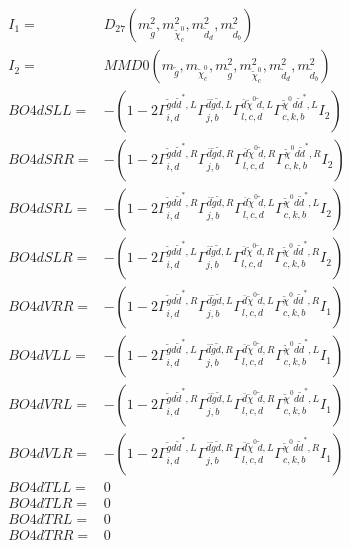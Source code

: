 \documentclass[A4,landscape]{article}
\begin{document}
\begin{align} 
I_1 = & D_{27}(m^2_{\tilde{g}}, m^2_{\tilde{\chi}^0_{{c}}}, m^2_{\tilde{d}_{{d}}}, m^2_{\tilde{d}_{{b}}}) \\ 
I_2 = & MMD0(m_{\tilde{g}}, m_{\tilde{\chi}^0_{{c}}}, m^2_{\tilde{g}}, m^2_{\tilde{\chi}^0_{{c}}}, m^2_{\tilde{d}_{{d}}}, m^2_{\tilde{d}_{{b}}}) \\ 
  BO4dSLL= & -(1
-
2 \Gamma^{\tilde{g} d \tilde{d}^*,L}_{i, d} \Gamma^{\bar{d}\tilde{g} \tilde{d} ,L}_{j, b} \Gamma^{\bar{d}\tilde{\chi}^0 \tilde{d} ,L}_{l, c, d} \Gamma^{\tilde{\chi}^0 d \tilde{d}^*,L}_{c, k, b} I_2) \\ 
  BO4dSRR= & -(1
-
2 \Gamma^{\tilde{g} d \tilde{d}^*,R}_{i, d} \Gamma^{\bar{d}\tilde{g} \tilde{d} ,R}_{j, b} \Gamma^{\bar{d}\tilde{\chi}^0 \tilde{d} ,R}_{l, c, d} \Gamma^{\tilde{\chi}^0 d \tilde{d}^*,R}_{c, k, b} I_2) \\ 
  BO4dSRL= & -(1
-
2 \Gamma^{\tilde{g} d \tilde{d}^*,R}_{i, d} \Gamma^{\bar{d}\tilde{g} \tilde{d} ,R}_{j, b} \Gamma^{\bar{d}\tilde{\chi}^0 \tilde{d} ,L}_{l, c, d} \Gamma^{\tilde{\chi}^0 d \tilde{d}^*,L}_{c, k, b} I_2) \\ 
  BO4dSLR= & -(1
-
2 \Gamma^{\tilde{g} d \tilde{d}^*,L}_{i, d} \Gamma^{\bar{d}\tilde{g} \tilde{d} ,L}_{j, b} \Gamma^{\bar{d}\tilde{\chi}^0 \tilde{d} ,R}_{l, c, d} \Gamma^{\tilde{\chi}^0 d \tilde{d}^*,R}_{c, k, b} I_2) \\ 
  BO4dVRR= & -(1
-
2 \Gamma^{\tilde{g} d \tilde{d}^*,R}_{i, d} \Gamma^{\bar{d}\tilde{g} \tilde{d} ,L}_{j, b} \Gamma^{\bar{d}\tilde{\chi}^0 \tilde{d} ,L}_{l, c, d} \Gamma^{\tilde{\chi}^0 d \tilde{d}^*,R}_{c, k, b} I_1) \\ 
  BO4dVLL= & -(1
-
2 \Gamma^{\tilde{g} d \tilde{d}^*,L}_{i, d} \Gamma^{\bar{d}\tilde{g} \tilde{d} ,R}_{j, b} \Gamma^{\bar{d}\tilde{\chi}^0 \tilde{d} ,R}_{l, c, d} \Gamma^{\tilde{\chi}^0 d \tilde{d}^*,L}_{c, k, b} I_1) \\ 
  BO4dVRL= & -(1
-
2 \Gamma^{\tilde{g} d \tilde{d}^*,R}_{i, d} \Gamma^{\bar{d}\tilde{g} \tilde{d} ,L}_{j, b} \Gamma^{\bar{d}\tilde{\chi}^0 \tilde{d} ,R}_{l, c, d} \Gamma^{\tilde{\chi}^0 d \tilde{d}^*,L}_{c, k, b} I_1) \\ 
  BO4dVLR= & -(1
-
2 \Gamma^{\tilde{g} d \tilde{d}^*,L}_{i, d} \Gamma^{\bar{d}\tilde{g} \tilde{d} ,R}_{j, b} \Gamma^{\bar{d}\tilde{\chi}^0 \tilde{d} ,L}_{l, c, d} \Gamma^{\tilde{\chi}^0 d \tilde{d}^*,R}_{c, k, b} I_1) \\ 
  BO4dTLL= & 0 \\ 
  BO4dTLR= & 0 \\ 
  BO4dTRL= & 0 \\ 
  BO4dTRR= & 0 \\ 
\end{align} 
\end{document}
